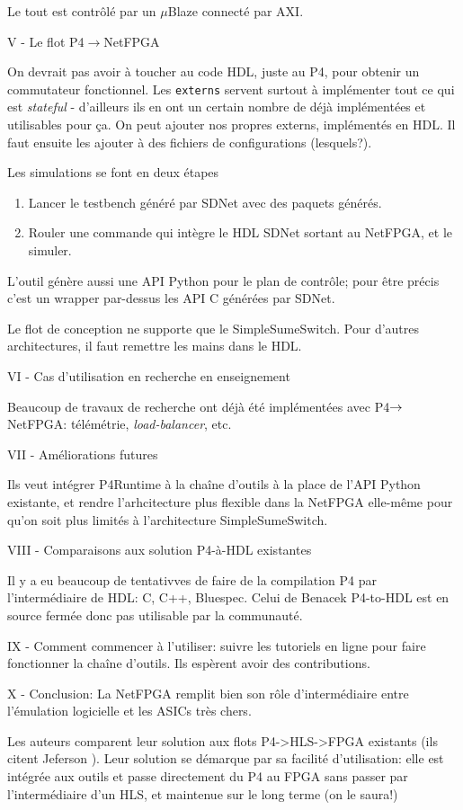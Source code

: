 Le tout est contrôlé par un $\mu$Blaze connecté par AXI.

V - Le flot P4$\rightarrow$NetFPGA

On devrait pas avoir à toucher au code HDL, juste au P4, pour obtenir un commutateur fonctionnel. Les \texttt{externs} servent surtout à implémenter tout ce qui est \emph{stateful} - d'ailleurs ils en ont un certain nombre de déjà implémentées et utilisables pour ça. On peut ajouter nos propres externs, implémentés en HDL. Il faut ensuite les ajouter à des fichiers de configurations (lesquels?).

Les simulations se font en deux étapes
\begin{enumerate}
	\item Lancer le testbench généré par SDNet avec des paquets générés.
	\item Rouler une commande qui intègre le HDL SDNet sortant au NetFPGA, et le simuler.
\end{enumerate}

L'outil génère aussi une API Python pour le plan de contrôle; pour être précis c'est un wrapper par-dessus les API C générées par SDNet.

Le flot de conception ne supporte que le SimpleSumeSwitch. Pour d'autres architectures, il faut remettre les mains dans le HDL.

VI - Cas d'utilisation en recherche en enseignement

Beaucoup de travaux de recherche ont déjà été implémentées avec P4$\rightarrow$NetFPGA: télémétrie, \emph{load-balancer}, etc.

VII - Améliorations futures

Ils veut intégrer P4Runtime à la chaîne d'outils à la place de l'API Python existante, et rendre l'arhcitecture plus flexible dans la NetFPGA elle-même pour qu'on soit plus limités à l'architecture SimpleSumeSwitch.

VIII - Comparaisons aux solution P4-à-HDL existantes

Il y a eu beaucoup de tentativves de faire de la compilation P4 par l'intermédiaire de HDL: C, C++, Bluespec. Celui de Benacek \og P4-to-HDL \fg est en source fermée donc pas utilisable par la communauté.

IX - Comment commencer à l'utiliser: suivre les tutoriels en ligne pour faire fonctionner la chaîne d'outils. Ils espèrent avoir des contributions.

X - Conclusion: La NetFPGA remplit bien son rôle d'intermédiaire entre l'émulation logicielle et les ASICs très chers.

 Les auteurs comparent leur solution aux flots P4->HLS->FPGA existants (ils citent Jeferson \cite{santiago_da_silva_p4-compatible_2018}). Leur solution se démarque par sa facilité d'utilisation: elle est intégrée aux outils et passe directement du P4 au FPGA sans passer par l'intermédiaire d'un HLS, et maintenue sur le long terme (on le saura!)


\clearpage
